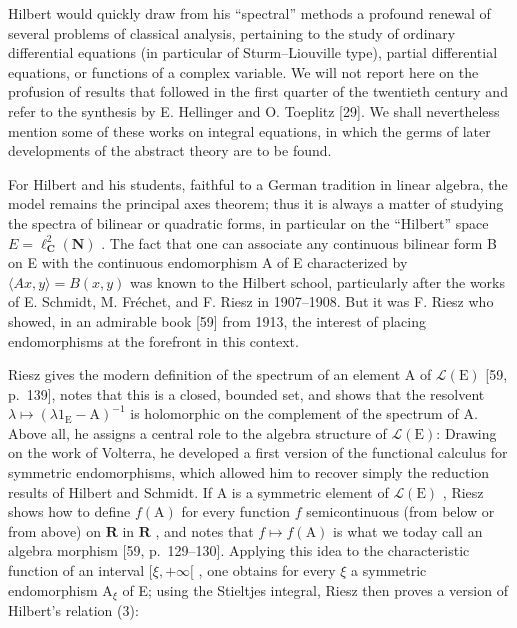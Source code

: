 Hilbert would quickly draw from his “spectral” methods a profound renewal of several problems of classical analysis, pertaining to the study of ordinary differential equations (in particular of Sturm–Liouville type), partial differential equations, or functions of a complex variable. We will not report here on the profusion of results that followed in the first quarter of the twentieth century and refer to the synthesis by E. Hellinger and O. Toeplitz [29]. We shall nevertheless mention some of these works on integral equations, in which the germs of later developments of the abstract theory are to be found.

For Hilbert and his students, faithful to a German tradition in linear algebra, the model remains the principal axes theorem; thus it is always a matter of studying the spectra of bilinear or quadratic forms, in particular on the “Hilbert” space \(E = \ell_{\mathbf{C}}^{2}(\mathbf{N})\) . The fact that one can associate any continuous bilinear form B on E with the continuous endomorphism A of E characterized by \(\langle Ax, y \rangle = B(x, y)\) was known to the Hilbert school, particularly after the works of E. Schmidt, M. Fréchet, and F. Riesz in 1907–1908. But it was F. Riesz who showed, in an admirable book [59] from 1913, the interest of placing endomorphisms at the forefront in this context.

Riesz gives the modern definition of the spectrum of an element A of \(\mathcal{L}(\mathrm{E})\) [59, p.~139], notes that this is a closed, bounded set, and shows that the resolvent \(\lambda \mapsto (\lambda 1_{\mathrm{E}} - \mathrm{A})^{-1}\) is holomorphic on the complement of the spectrum of A. Above all, he assigns a central role to the algebra structure of \(\mathcal{L}(\mathrm{E})\): Drawing on the work of Volterra, he developed a first version of the functional calculus for symmetric endomorphisms, which allowed him to recover simply the reduction results of Hilbert and Schmidt. If A is a symmetric element of \(\mathcal{L}(\mathrm{E})\) , Riesz shows how to define \(f(\mathrm{A})\) for every function \(f\) semicontinuous (from below or from above) on \(\mathbf{R}\) in \(\mathbf{R}\) , and notes that \(f \mapsto f(\mathrm{A})\) is what we today call an algebra morphism [59, p.~129--130]. Applying this idea to the characteristic function of an interval \([\xi, +\infty[\) , one obtains for every \(\xi\) a symmetric endomorphism \(\mathrm{A}_{\xi}\) of E; using the Stieltjes integral, Riesz then proves a version of Hilbert's relation (3):

